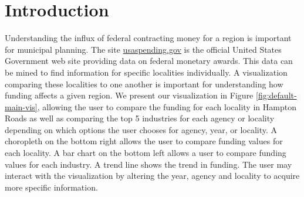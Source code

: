 \documentclass[10pt,journal,compsoc]{IEEEtran}
\begin{document}
%
\IEEEpeerreviewmaketitle

\ifCLASSOPTIONcompsoc
{}
\else
\section{Introduction}
\label{sec:introduction}
\fi

Understanding the influx of federal contracting money for a region is important for municipal planning.  The site \url{usaspending.gov} is the official United States Government web site providing data on federal monetary awards.  This data can be mined to find information for specific localities individually.  A visualization comparing these localities to one another is important for understanding how funding affects a given region.  We present our visualization in Figure \ref{fig:default-main-vis}, allowing the user to compare the funding for each locality in Hampton Roads as well as comparing the top 5 industries for each agency or locality depending on which options the user chooses for agency, year, or locality.  A choropleth on the bottom right allows the user to compare funding values for each locality.  A bar chart on the bottom left allows a user to compare funding values for each industry.  A trend line shows the trend in funding.  The user may interact with the visualization by altering the year, agency and locality to acquire more specific information.
\end{document}
